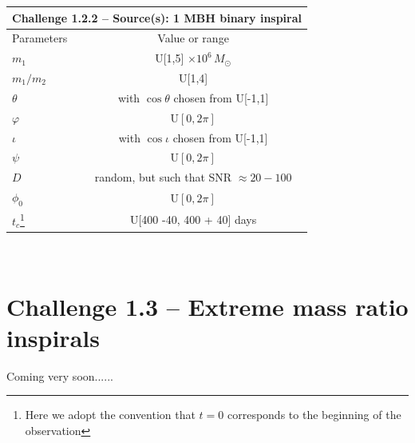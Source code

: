 \documentclass[11pt]{report}
\begin{document}
\begin{description}
\begin{center}
\begin{tabular}{l|c}
\hline \hline
\multicolumn{2}{c}{{\bf Challenge 1.2.2 -- Source(s): 1 MBH binary inspiral}} \\
\hline
Parameters & Value or range \\
\hline
$m_1$             & U[1,5] $\times 10^6\,M_\odot$ \\
$m_1/m_2$         & U[1,4] \\
$\theta$          & with $\cos\theta$ chosen from U[-1,1]\\
$\varphi$         & U$[0,2\pi]$ \\ 
$\iota$           & with $\cos\iota$ chosen from U[-1,1]\\ 
$\psi$            & U$[0,2\pi]$ \\
$D$               & random, but such that SNR $\approx 20-100$ \\
$\phi_0$          & U$[0,2\pi]$ \\
$t_c$\footnote{Here we adopt the convention that $t = 0$ corresponds to the beginning of the observation}             & U[400 -40, 400 + 40] days \\
\hline \hline
\end{tabular} \\
\end{center}

\end{description}

\section{Challenge 1.3 -- Extreme mass ratio inspirals}

Coming very soon......

\begin{thebibliography}{}

\end{thebibliography}
\end{document}
